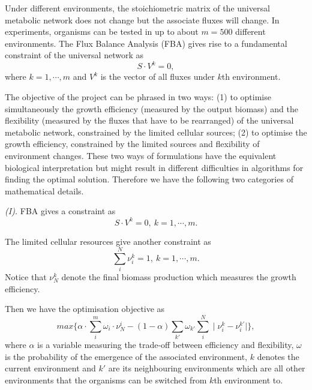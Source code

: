 \documentclass[paper=a4, fontsize=12pt]{scrartcl}	%
\numberwithin{equation}{section}					%
\numberwithin{figure}{section}					%
\numberwithin{table}{section}					%
\begin{document}
Under different environments, the stoichiometric matrix of the universal metabolic network does not change but the associate fluxes will change.  In experiments, organisms can be tested in up to about $m=500$ different environments. The Flux Balance Analysis (FBA) gives rise to a fundamental constraint of the universal network as
\begin{equation}
\nonumber S\cdot V^k=0, 
\end{equation}
where $k=1, \cdots, m$ and $V^k$ is the vector of all fluxes under $k$th environment. 

The objective of the project can be phrased in two ways: (1) to optimise simultaneously the growth efficiency (measured by the output biomass) and the flexibility (measured by the fluxes that have to be rearranged) of the universal metabolic network, constrained by the limited cellular sources; (2) to optimise the growth efficiency, constrained by the limited sources and flexibility of environment changes. These two ways of formulations have the equivalent biological interpretation but might result in different difficulties in algorithms for finding the optimal solution. Therefore we have the following two categories of mathematical details.

{\it (I).} FBA gives a constraint as 
\begin{equation}
\label{FBA}
S\cdot V^k=0,\ k=1,\cdots,m.
\end{equation}

The limited cellular resources give another constraint as
\begin{equation}
\label{source} \sum_i^N\nu_i^k =1,\ k=1,\cdots,m.
\end{equation}
Notice that $\nu_N^k$ denote the final biomass production which measures the growth efficiency. 

Then we have the optimisation objective as
\begin{equation}\label{objective}
max\{ \alpha \cdot \sum_i^m \omega_i\cdot \nu_{N}^i-(1-\alpha) \sum_{k'}\omega_{k'} \sum_i^N\mid \nu_i^k-\nu_i^{k'} \mid \}, 
\end{equation}
where $\alpha$ is a variable measuring the trade-off between efficiency and flexibility, $\omega$ is the probability of the emergence of the associated environment, $k$ denotes the current environment and $k'$ are its neighbouring environments which are all other environments that the organisms can be switched from $k$th environment to. 
\end{document}
